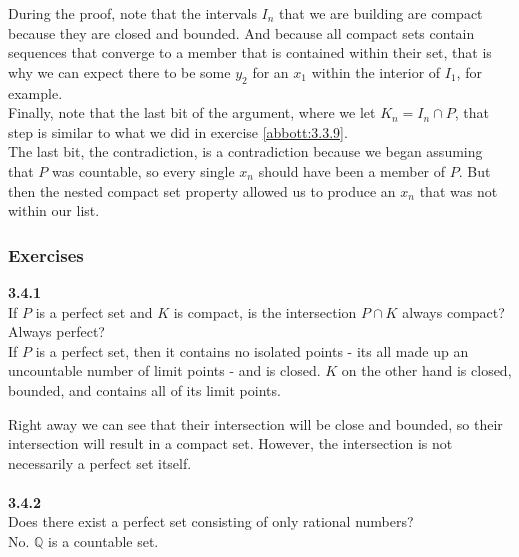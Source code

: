 During the proof, note that the intervals $I_n$ that we are building are compact because they are closed
and bounded.
And because all compact sets contain sequences that converge to a member that is contained within their set,
that is why we can expect there to be some $y_2$ for an $x_1$ within the interior of $I_1$, for example.
\\

Finally, note that the last bit of the argument, where we let $K_n = I_n \cap P$, that step is similar
to what we did in exercise \ref{abbott:3.3.9}.
\\

The last bit, the contradiction, is a contradiction because we began assuming that $P$ was countable,
so every single $x_n$ should have been a member of $P$.
But then the nested compact set property allowed us to produce an $x_n$ that was not within our list.
\\



\subsubsection{Exercises}


\textbf{3.4.1}
\\

If $P$ is a perfect set and $K$ is compact, is the intersection $P \cap K$ always compact?
Always perfect?
\\

If $P$ is a perfect set, then it contains no isolated points - its all made up an uncountable
number of limit points - and is closed.
$K$ on the other hand is closed, bounded, and contains all of its limit points.

Right away we can see that their intersection will be close and bounded, so their intersection will
result in a compact set.
However, the intersection is not necessarily a perfect set itself.
\\~\\



\textbf{3.4.2}
\\

Does there exist a perfect set consisting of only rational numbers?
\\

No. $\mathbb{Q}$ is a countable set.
\\~\\


